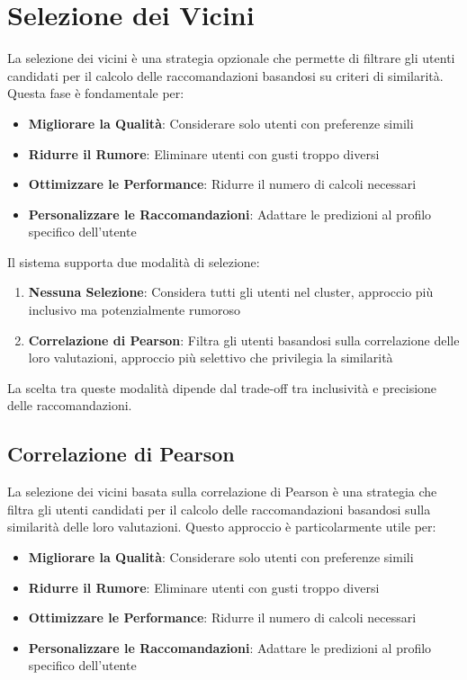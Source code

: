 \section{Selezione dei Vicini}

La selezione dei vicini è una strategia opzionale che permette di filtrare gli utenti candidati per il calcolo delle raccomandazioni basandosi su criteri di similarità. Questa fase è fondamentale per:

\begin{itemize}
    \item \textbf{Migliorare la Qualità}: Considerare solo utenti con preferenze simili
    \item \textbf{Ridurre il Rumore}: Eliminare utenti con gusti troppo diversi
    \item \textbf{Ottimizzare le Performance}: Ridurre il numero di calcoli necessari
    \item \textbf{Personalizzare le Raccomandazioni}: Adattare le predizioni al profilo specifico dell'utente
\end{itemize}

Il sistema supporta due modalità di selezione:

\begin{enumerate}
    \item \textbf{Nessuna Selezione}: Considera tutti gli utenti nel cluster, approccio più inclusivo ma potenzialmente rumoroso
    \item \textbf{Correlazione di Pearson}: Filtra gli utenti basandosi sulla correlazione delle loro valutazioni, approccio più selettivo che privilegia la similarità
\end{enumerate}

La scelta tra queste modalità dipende dal trade-off tra inclusività e precisione delle raccomandazioni.


\subsection{Correlazione di Pearson}

La selezione dei vicini basata sulla correlazione di Pearson è una strategia che filtra gli utenti candidati per il calcolo delle raccomandazioni basandosi sulla similarità delle loro valutazioni. Questo approccio è particolarmente utile per:

\begin{itemize}
    \item \textbf{Migliorare la Qualità}: Considerare solo utenti con preferenze simili
    \item \textbf{Ridurre il Rumore}: Eliminare utenti con gusti troppo diversi
    \item \textbf{Ottimizzare le Performance}: Ridurre il numero di calcoli necessari
    \item \textbf{Personalizzare le Raccomandazioni}: Adattare le predizioni al profilo specifico dell'utente
\end{itemize}

